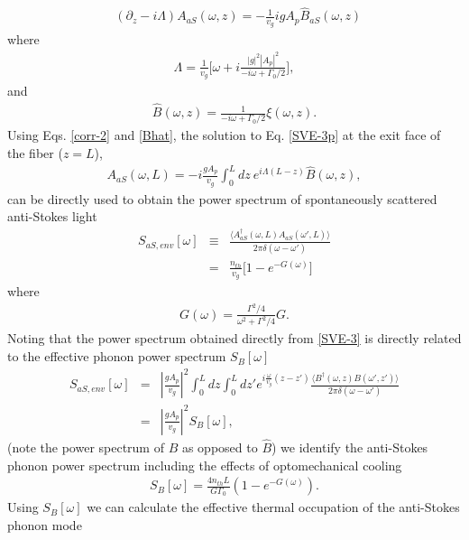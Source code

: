 \begin{eqnarray}
\label{SVE-3p}
   && (\partial_z -i \Lambda)A_{aS}(\omega,z) = -\frac{1}{v_g}i g A_p \hat{B}_{aS}(\omega,z) \quad
\end{eqnarray}
where
\begin{eqnarray}
\label{lambda}
    \Lambda = \frac{1}{v_g}\bigg[\omega + i \frac{|g|^2 |A_p|^2}{
-i\omega + \Gamma_0/2} \bigg],
\end{eqnarray}
and \begin{eqnarray}
\label{Bhat}
\hat{B}(\omega,z) = \frac{1}{
-i\omega + \Gamma_0/2} \xi(\omega,z).
\end{eqnarray}
Using Eqs. \eqref{corr-2} and \eqref{Bhat}, the solution to Eq. \eqref{SVE-3p} at the exit face of the fiber ($z=L$),
\begin{eqnarray}
    A_{aS}(\omega,L) = -i \frac{g A_p}{v_g}\int_0^{L} dz \ e^{i\Lambda(L-z)} \hat{B}(\omega,z),
\end{eqnarray}
can be directly used to obtain the power spectrum of spontaneously scattered anti-Stokes light
\begin{eqnarray}
  S_{aS,env}[\omega] &\equiv& \frac{\langle A_{aS}^\dag(\omega,L) A_{aS}(\omega',L)\rangle}{2\pi\delta(\omega-\omega')} \nonumber \\
  &=& \frac{n_{th}}{v_g}
  \bigg[
  1-e^{
  -G(\omega)} \bigg]
\end{eqnarray}
where
\begin{eqnarray}
   G(\omega) =  \frac{\Gamma^2/4}{\omega^2+\Gamma^2/4} G.
\end{eqnarray}
Noting that the power spectrum obtained directly from \eqref{SVE-3} is directly related to the effective phonon power spectrum $S_B[\omega]$
\begin{eqnarray}
 S_{aS,env}[\omega] \!\!\!& = &\!\!\! \left| \frac{g A_p}{v_g} \right|^2 \!\! \int_0^{L} \!\!\!\!\! dz\!\!\int_0^{L} \!\!\!\!\!dz'
 e^{i\frac{\omega}{v_g}(z\!-\!z')}
 \frac{\langle {B}^\dag(\omega,z) {B}(\omega',z')\rangle}{2\pi\delta(\omega-\omega')} \nonumber \\
& = &\!\!\! \left| \frac{g A_p}{v_g} \right|^2 S_B[\omega],
\end{eqnarray}
(note the power spectrum of $B$ as opposed to $\hat{B}$) we identify the anti-Stokes phonon power spectrum including the effects of optomechanical cooling
\begin{eqnarray}
\label{phonon_ps}
 S_B[\omega] = \frac{4 n_{th} L}{G \Gamma_0}(1-e^{-G(\omega)}).
\end{eqnarray}
Using $S_B[\omega]$ we can calculate the effective thermal occupation of the anti-Stokes phonon mode
